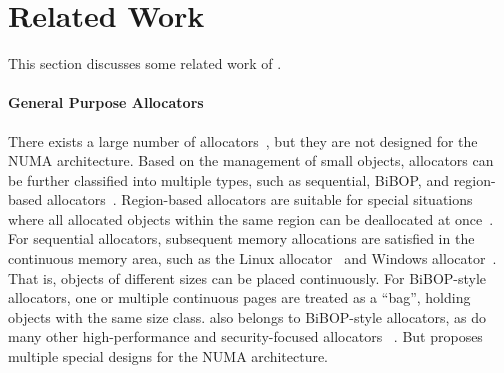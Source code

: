 \section{Related Work}

\label{sec:related}

This section discusses some related work of \NM{}. 

\paragraph{General Purpose Allocators}
 There exists a large number of allocators~\cite{dlmalloc,Hoard,tcmalloc,jemalloc,Scalloc}, but they are not designed for the NUMA architecture. Based on the management of small objects, allocators can be further classified into multiple types, such as sequential, BiBOP, and region-based allocators~\cite{Gay:1998:MME:277650.277748,  DieHarder}. Region-based allocators are suitable for special situations where all allocated objects within the same region can be deallocated at once~\cite{Gay:1998:MME:277650.277748}. For sequential allocators, subsequent memory allocations are satisfied in the continuous memory area, such as the Linux allocator~\cite{dlmalloc} and Windows allocator~\cite{DieHarder}. That is, objects of different sizes can be placed continuously. For BiBOP-style allocators, one or multiple continuous pages are treated as a ``bag'', holding objects with the same size class. \NM{} also belongs to BiBOP-style allocators, as do many other high-performance and security-focused allocators ~\cite{tcmalloc, jemalloc, Hoard, Scalloc, DieHarder}. But \NM{} proposes multiple special designs for the NUMA architecture.
 

